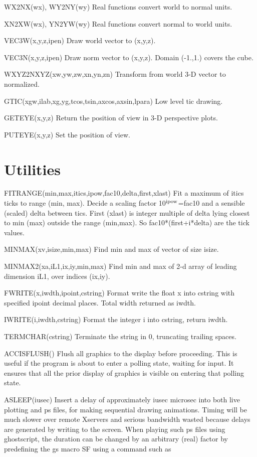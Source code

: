 \documentclass[12pt]{article}
\begin{document}
WX2NX(wx), WY2NY(wy) Real functions convert world to normal units.

XN2XW(wx), YN2YW(wy) Real functions convert normal to world units.

VEC3W(x,y,z,ipen) Draw world vector to (x,y,z).

VEC3N(x,y,z,ipen) Draw norm vector to (x,y,z). Domain (-1.,1.) covers
the cube.

WXYZ2NXYZ(xw,yw,zw,xn,yn,zn) Transform from world 3-D vector to
normalized.

GTIC(xgw,ilab,xg,yg,tcos,tsin,axcos,axsin,lpara) Low level tic drawing.

GETEYE(x,y,z) Return the position of view in 3-D perspective plots.

PUTEYE(x,y,z) Set the position of view.

\section{Utilities}

FITRANGE(min,max,itics,ipow,fac10,delta,first,xlast) Fit a maximum of
itics ticks to range (min, max). Decide a scaling factor 10$^{\rm
ipow}$=fac10 and a sensible (scaled) delta between tics. First (xlast)
is integer multiple of delta lying closest to min (max) outside the
range (min,max). So fac10*(first+i*delta) are the tick values.

MINMAX(xv,isize,min,max) Find min and max of vector of size isize.

MINMAX2(xa,iL1,ix,iy,min,max) Find min and max of 2-d array of
leading dimension iL1, over indices (ix,iy).

FWRITE(x,iwdth,ipoint,cstring) Format write the float x into cstring
with specified ipoint decimal places. Total width returned as iwdth.

IWRITE(i,iwdth,cstring) Format the integer i into cstring, return iwdth.

TERMCHAR(cstring) Terminate the string in 0, truncating trailing spaces.

ACCISFLUSH() Flush all graphics to the display before proceeding. This
is useful if the program is about to enter a polling state, waiting
for input. It ensures that all the prior display of graphics is visible on
entering that polling state.

ASLEEP(iusec) Insert a delay of approximately iusec microsec into both
live plotting and ps files, for making sequential drawing animations.
Timing will be much slower over remote Xservers and serious bandwidth
wasted because delays are generated by writing to the screen. When
playing such ps files using ghostscript, the duration can be changed
by an arbitrary (real) factor by predefining the gs macro SF using a
command such as
\end{document}
